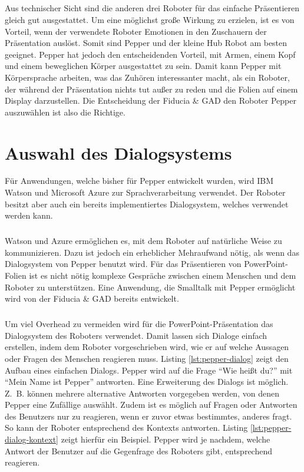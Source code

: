 \subparagraph{}
Aus technischer Sicht sind die anderen drei Roboter für das einfache
Präsentieren gleich gut ausgestattet. Um eine möglichst große Wirkung zu
erzielen, ist es von Vorteil, wenn der verwendete Roboter Emotionen in den
Zuschauern der Präsentation auslöst. Somit sind Pepper und der kleine Hub
Robot am besten geeignet. Pepper hat jedoch den entscheidenden Vorteil, mit
Armen, einem Kopf und einem beweglichen Körper ausgestattet zu sein. Damit kann
Pepper mit Körpersprache arbeiten, was das Zuhören interessanter macht, als ein
Roboter, der während der Präsentation nichts tut außer zu reden und die Folien
auf einem Display darzustellen. Die Entscheidung der Fiducia \& GAD den Roboter
Pepper auszuwählen ist also die Richtige.

\section{Auswahl des Dialogsystems}\label{sec:auswahl-dialogsystem}
Für Anwendungen, welche bisher für Pepper entwickelt wurden, wird IBM Watson und
Microsoft Azure zur Sprachverarbeitung verwendet. Der Roboter besitzt aber auch
ein bereits implementiertes Dialogsystem, welches verwendet werden kann.

\subparagraph{}
Watson und Azure ermöglichen es, mit dem Roboter auf natürliche Weise zu
kommunizieren. Dazu ist jedoch ein erheblicher Mehraufwand nötig, als wenn das
Dialogsystem von Pepper benutzt wird. Für das Präsentieren von PowerPoint-Folien
ist es nicht nötig komplexe Gespräche zwischen einem Menschen und dem Roboter zu
unterstützen. Eine Anwendung, die Smalltalk mit Pepper ermöglicht wird von der
Fiducia \& GAD bereits entwickelt.

\subparagraph{}
Um viel Overhead zu vermeiden wird für die PowerPoint-Präsentation das
Dialogsystem des Roboters verwendet. Damit lassen sich Dialoge einfach
erstellen, indem dem Roboter vorgeschrieben wird, wie er auf welche Aussagen
oder Fragen des Menschen reagieren muss. Listing \ref{lst:pepper-dialog} zeigt
den Aufbau eines einfachen Dialogs. Pepper wird auf die Frage "`Wie heißt du?"'
mit "`Mein Name ist Pepper"' antworten. Eine Erweiterung des Dialogs ist
möglich. Z.~B. können mehrere alternative Antworten vorgegeben werden, von denen
Pepper eine Zufällige auswählt. Zudem ist es möglich auf Fragen oder Antworten
des Benutzers nur zu reagieren, wenn er zuvor etwas bestimmtes, anderes fragt.
So kann der Roboter entsprechend des Kontexts antworten. Listing
\ref{lst:pepper-dialog-kontext} zeigt hierfür ein Beispiel. Pepper wird je
nachdem, welche Antwort der Benutzer auf die Gegenfrage des Roboters gibt,
entsprechend reagieren.

